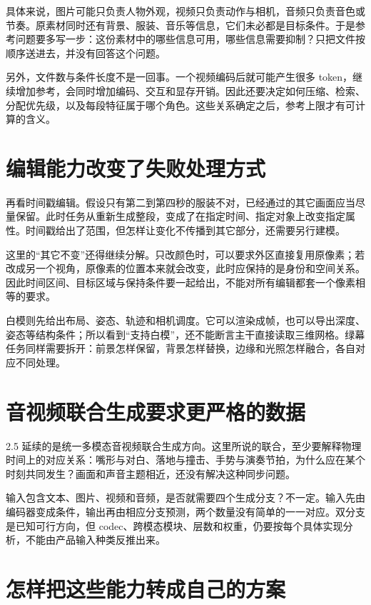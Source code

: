 具体来说，图片可能只负责人物外观，视频只负责动作与相机，音频只负责音色或节奏。原素材同时还有背景、服装、音乐等信息，它们未必都是目标条件。于是参考问题要多写一步：这份素材中的哪些信息可用，哪些信息需要抑制？只把文件按顺序送进去，并没有回答这个问题。

另外，文件数与条件长度不是一回事。一个视频编码后就可能产生很多 token，继续增加参考，会同时增加编码、交互和显存开销。因此还要决定如何压缩、检索、分配优先级，以及每段特征属于哪个角色。这些关系确定之后，参考上限才有可计算的含义。

\section{编辑能力改变了失败处理方式}\label{seedance-m00-ux7f16ux8f91ux80fdux529bux6539ux53d8ux4e86ux5931ux8d25ux5904ux7406ux65b9ux5f0f}

再看时间戳编辑。假设只有第二到第四秒的服装不对，已经通过的其它画面应当尽量保留。此时任务从重新生成整段，变成了在指定时间、指定对象上改变指定属性。时间戳给出了范围，但怎样让变化不传播到其它部分，还需要另行建模。

这里的“其它不变”还得继续分解。只改颜色时，可以要求外区直接复用原像素；若改成另一个视角，原像素的位置本来就会改变，此时应保持的是身份和空间关系。因此时间区间、目标区域与保持条件要一起给出，不能对所有编辑都套一个像素相等的要求。

白模则先给出布局、姿态、轨迹和相机调度。它可以渲染成帧，也可以导出深度、姿态等结构条件；所以看到“支持白模”，还不能断言主干直接读取三维网格。绿幕任务同样需要拆开：前景怎样保留，背景怎样替换，边缘和光照怎样融合，各自对应不同处理。

\section{音视频联合生成要求更严格的数据}\label{seedance-m00-ux97f3ux89c6ux9891ux8054ux5408ux751fux6210ux8981ux6c42ux66f4ux4e25ux683cux7684ux6570ux636e}

2.5 延续的是统一多模态音视频联合生成方向。这里所说的联合，至少要解释物理时间上的对应关系：嘴形与对白、落地与撞击、手势与演奏节拍，为什么应在某个时刻共同发生？画面和声音主题相近，还没有解决这种同步问题。

输入包含文本、图片、视频和音频，是否就需要四个生成分支？不一定。输入先由编码器变成条件，输出再由相应分支预测，两个数量没有简单的一一对应。双分支是已知可行方向，但 codec、跨模态模块、层数和权重，仍要按每个具体实现分析，不能由产品输入种类反推出来。

\section{怎样把这些能力转成自己的方案}\label{seedance-m00-ux600eux6837ux628aux8fd9ux4e9bux80fdux529bux8f6cux6210ux81eaux5df1ux7684ux65b9ux6848}

